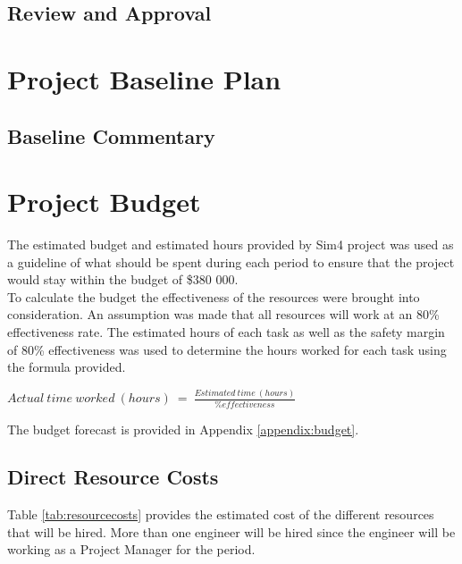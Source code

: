 \subsection{Review and Approval}

\section{Project Baseline Plan}
\subsection{Baseline Commentary}

\section{Project Budget}

The estimated budget and estimated hours provided by Sim4 project was used as a guideline of what should be spent during each period to ensure that the project would stay within the budget of \$380 000.\\

\noindent
To calculate the budget the effectiveness of the resources were brought into consideration. An assumption was made that all resources will work at an 80\% effectiveness rate. The estimated hours of each task as well as the safety margin of 80\% effectiveness was used to determine the hours worked for each task using the formula provided.\\

\begin{center}
$ Actual\ time\ worked\ (hours)\ =\ \frac{Estimated\ time\ (hours)}{\% effectiveness} $
\end{center}

The budget forecast is provided in Appendix \ref{appendix:budget}.

\subsection{Direct Resource Costs}

Table \ref{tab:resourcecosts} provides the estimated cost of the different resources that will be hired. More than one engineer will be hired since the engineer will be working as a Project Manager for the period.

